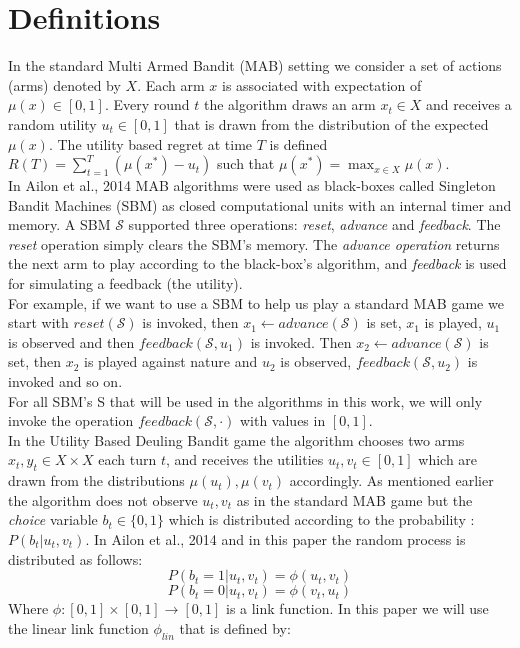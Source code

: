 \documentclass{llncs}
\begin{document}
\section{Definitions}

	In the standard Multi Armed Bandit (MAB) setting we consider a set of actions (arms) denoted by $X$. Each arm $x$ is associated with expectation of  $\mu(x) \in [0,1]$.
	Every round $t$ the algorithm draws an arm $x_t \in X$ and receives a random utility $u_t \in [0,1]$ that is drawn from the distribution of the expected $\mu(x)$.
	The utility based regret at time $T$ is defined $ R(T) = \sum_{t=1}^T(\mu(x^*)- u_t)$ such that $\mu(x^*) = \max_{x\in X}\mu(x)$.
	\\
	In Ailon et al., 2014 MAB algorithms were used as black-boxes called Singleton Bandit Machines (SBM) as closed computational units with an internal timer and memory. A SBM $\mathcal{S}$ supported three operations: {\textit{reset}}, {\textit{advance}} and {\textit{feedback}}.  
	The {\textit{reset}} operation simply clears the SBM's memory. The {\textit{advance operation}} returns the next arm to play according to the black-box's algorithm, and {\textit{feedback}} is used for simulating a feedback (the utility). 
	\\
	For example, if we want to use a SBM to help us play a standard MAB game we start with $reset(\mathcal{S})$ is invoked, then $x_1 \leftarrow advance(\mathcal{S})$ is set,  $x_1$ is played, $u_1$ is observed and then  $feedback(\mathcal{S}, u_1)$ is invoked. 
	Then $x_2 \leftarrow advance(\mathcal{S})$ is set, then $x_2$ is played against nature and  $u_2$ is observed, $feedback(\mathcal{S}, u_2)$ is invoked and so on. 
	\\
	For all SBM’s S that will be used in the algorithms in
this work, we will only invoke the operation $feedback(\mathcal{S},\cdot)$ with values in $[0, 1]$.	
	\\
	In the Utility Based Deuling Bandit game the algorithm chooses two arms $x_t, y_t \in X \times X$ each turn $t$, and receives the utilities $u_t, v_t \in [0,1]$ which are drawn from the distributions $\mu(u_t), \mu(v_t)$ accordingly. As mentioned earlier the algorithm does not observe $u_t, v_t$ as in the standard MAB game but the {\textit{choice}} variable $b_t \in \{0,1 \}$ which is distributed according to the probability : $P(b_t|u_t, v_t)$. In Ailon et al., 2014 and in this paper the random process is distributed as follows:
	$$P(b_t = 1|u_t, v_t) = \phi(u_t, v_t)$$
	$$P(b_t = 0|u_t, v_t) = \phi(v_t, u_t)$$	
	Where $\phi : [0,1]\times [0,1] \rightarrow [0,1]$ is a link function. In this paper we will use the linear link function $\phi_{lin}$ that is defined by:
\end{document}
